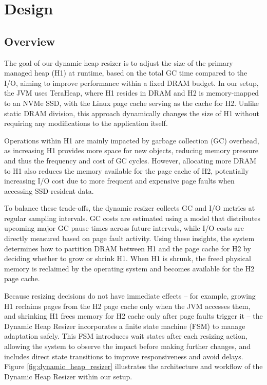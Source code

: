 \section{Design}
\subsection{Overview}
The goal of our dynamic heap resizer is to adjust the size of the primary managed heap (H1) at runtime, based on the total GC time compared to the I/O, aiming to improve performance within a fixed DRAM budget. In our setup, the JVM uses TeraHeap, where H1 resides in DRAM and H2 is memory-mapped to an NVMe SSD, with the Linux page cache serving as the cache for H2. Unlike static DRAM division, this approach dynamically changes the size of H1 without requiring any modifications to the application itself.

Operations within H1 are mainly impacted by garbage collection (GC) overhead, as increasing H1 provides more space for new objects, reducing memory pressure and thus the frequency and cost of GC cycles. However, allocating more DRAM to H1 also reduces the memory available for the page cache of H2, potentially increasing I/O cost due to more frequent and expensive page faults when accessing SSD-resident data.

To balance these trade-offs, the dynamic resizer collects GC and I/O metrics at regular sampling intervals. GC costs are estimated using a model that distributes upcoming major GC pause times across future intervals, while I/O costs are directly measured based on page fault activity. Using these insights, the system determines how to partition DRAM between H1 and the page cache for H2 by deciding whether to grow or shrink H1. When H1 is shrunk, the freed physical memory is reclaimed by the operating system and becomes available for the H2 page cache.

Because resizing decisions do not have immediate effects – for example, growing H1 reclaims pages from the H2 page cache only when the JVM accesses them, and shrinking H1 frees memory for H2 cache only after page faults trigger it – the Dynamic Heap Resizer incorporates a finite state machine (FSM) to manage adaptation safely. This FSM introduces wait states after each resizing action, allowing the system to observe the impact before making further changes, and includes direct state transitions to improve responsiveness and avoid delays. Figure \ref{fig:dynamic_heap_resizer} illustrates the architecture and workflow of the Dynamic Heap Resizer within our setup.


